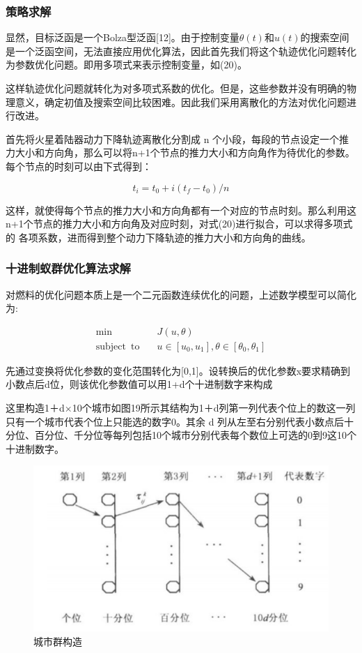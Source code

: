 \documentclass[UTF8,12pt]{ctexart}
\begin{document}
\subsubsection{策略求解}

显然，目标泛函是一个Bolza型泛函[12]。由于控制变量$\theta(t)$和$u(t)$的搜索空间是一个泛函空间，无法直接应用优化算法，因此首先我们将这个轨迹优化问题转化为参数优化问题。即用多项式来表示控制变量，如(20)。

这样轨迹优化问题就转化为对多项式系数的优化。但是，这些参数并没有明确的物理意义，确定初值及搜索空间比较困难。因此我们采用离散化的方法对优化问题进行改进。

首先将火星着陆器动力下降轨迹离散化分割成 n 个小段，每段的节点设定一个推力大小和方向角，那么可以将n+1个节点的推力大小和方向角作为待优化的参数。每个节点的时刻可以由下式得到：

\begin{equation}
	t_i=t_0+i(t_f-t_0)/n
\end{equation}

这样，就使得每个节点的推力大小和方向角都有一个对应的节点时刻。那么利用这n+1个节点的推力大小和方向角及对应时刻，对式(20)进行拟合，可以求得多项式的 各项系数，进而得到整个动力下降轨迹的推力大小和方向角的曲线。

\subsubsection{十进制蚁群优化算法求解}

对燃料的优化问题本质上是一个二元函数连续优化的问题，上述数学模型可以简化为:

\begin{equation}
	\begin{aligned}
		\min\quad&J(u,\theta)\\
		\mathrm{subject\enspace to\quad}&u\in[u_0,u_1],\theta\in[\theta_0,\theta_1]
	\end{aligned}
\end{equation}

先通过变换将优化参数的变化范围转化为[0,1]。设转换后的优化参数x要求精确到小数点后d位，则该优化参数值可以用1+d个十进制数字来构成

这里构造1＋d×10个城市如图19所示其结构为1＋d列第一列代表个位上的数这一列只有一个城市代表个位上只能选的数字0。其余 d 列从左至右分别代表小数点后十分位、百分位、千分位等每列包括10个城市分别代表每个数位上可选的0到9这10个十进制数字。

\begin{figure}[htb]
	\centering
	\includegraphics[width=0.7\linewidth]{城市群构造.png}
	\caption{城市群构造}
	\label{fig:pathdemo}	
\end{figure}
\end{document}

